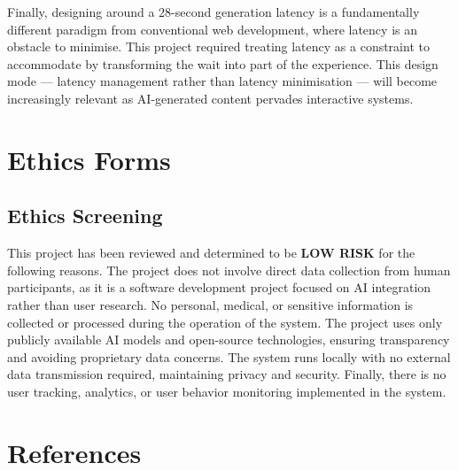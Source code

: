 \documentclass[12pt,a4paper]{article}
\begin{document}
Finally, designing around a 28-second generation latency is a fundamentally different paradigm from conventional web development, where latency is an obstacle to minimise. This project required treating latency as a constraint to accommodate by transforming the wait into part of the experience. This design mode --- latency management rather than latency minimisation --- will become increasingly relevant as AI-generated content pervades interactive systems.

    \section{Ethics Forms}

    \subsection{Ethics Screening}

    This project has been reviewed and determined to be \textbf{LOW RISK} for the following reasons. The project does not involve direct data collection from human participants, as it is a software development project focused on AI integration rather than user research. No personal, medical, or sensitive information is collected or processed during the operation of the system. The project uses only publicly available AI models and open-source technologies, ensuring transparency and avoiding proprietary data concerns. The system runs locally with no external data transmission required, maintaining privacy and security. Finally, there is no user tracking, analytics, or user behavior monitoring implemented in the system.


    \section{References}
\end{document}
